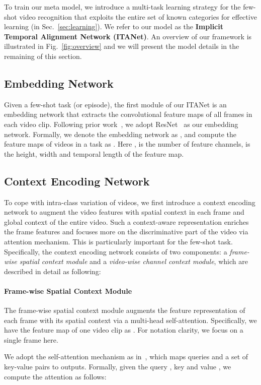 \documentclass{article}
\begin{document}
To train our meta model, we introduce a multi-task learning strategy for the few-shot video recognition that exploits the entire set of known categories for effective learning (in Sec.~\ref{sec:learning}).
We refer to our model as the \textbf{Implicit Temporal Alignment Network (ITANet)}. An overview of our framework is illustrated in Fig.~\ref{fig:overview} and we will present the model details in the remaining of this section.


\subsection{Embedding Network}\label{sec:embedding}
Given a few-shot task (or episode), the first module of our ITANet is an embedding network that extracts the convolutional feature maps of all frames in each video clip. Following prior work~\cite{cao2020few,zhu2018compound}, we adopt ResNet~\cite{he2016deep} as our embedding network. Formally, we denote the embedding network as , and compute the feature maps of videos in a task  as . Here ,  is the number of feature channels,  is the height, width and temporal length of the feature map.

\subsection{Context Encoding Network}\label{sec:context}
To cope with intra-class variation of videos, we first introduce a context encoding network to augment the video features with spatial context in each frame and global context of the entire video. Such a context-aware representation enriches the frame features and focuses more on the discriminative part of the video via attention mechanism. This is particularly important for the few-shot task. Specifically, the context encoding network consists of two components: a \textit{frame-wise spatial context module} and a \textit{video-wise channel context module}, which are described in detail as following:

\paragraph{Frame-wise Spatial Context Module} The frame-wise spatial context module augments the feature representation of each frame with its spatial context via a multi-head self-attention. Specifically, we have the feature map of one video clip as . For notation clarity, we focus on a single frame  here.

We adopt the self-attention mechanism as in~\cite{vaswani2017attention}, which maps queries and a set of key-value pairs to outputs. Formally, given the query , key  and value , we compute the attention as follows:
\end{document}
